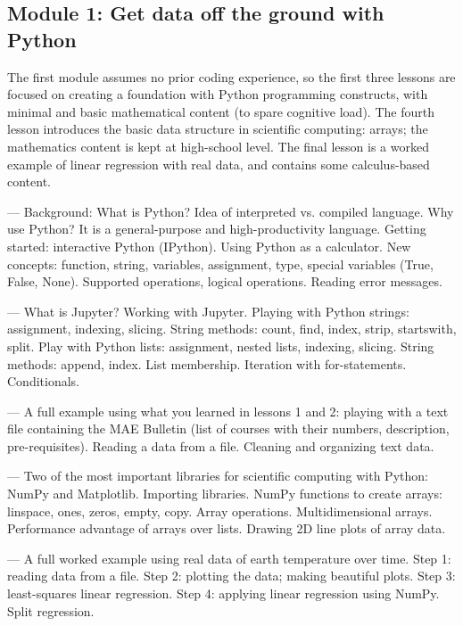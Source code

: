 \documentclass[10pt,journal,compsoc]{IEEEtran}
\begin{document}
\subsection*{Module 1: Get data off the ground with Python}
The first module assumes no prior coding experience, so the first three lessons are focused on creating a foundation with Python programming constructs, with minimal and basic mathematical content (to spare cognitive load). 
The fourth lesson introduces the basic data structure in scientific computing: arrays; the mathematics content is kept at high-school level.
The final lesson is a worked example of linear regression with real data, and contains some calculus-based content.

\begin{description}[style=unboxed]

\item[Lesson 1: Interacting with Python]---
Background: What is Python? Idea of interpreted vs. compiled language. Why use Python? It is a general-purpose and high-productivity language. Getting started: interactive Python (IPython). Using Python as a calculator. New concepts: function, string, variables, assignment, type, special variables (True, False, None). Supported operations, logical operations. Reading error messages.

\item[Lesson 2: Play with data in Jupyter]---
What is Jupyter? Working with Jupyter. Playing with Python strings: assignment, indexing, slicing. String methods: count, find, index, strip, startswith, split. Play with Python lists: assignment, nested lists, indexing, slicing. String methods: append, index. List membership. Iteration with for-statements. Conditionals.

\item[Lesson 3: Strings and lists in action]---
A full example using what you learned in lessons 1 and 2: playing with a text file containing the MAE Bulletin (list of courses with their numbers, description, pre-requisites). Reading a data from a file. Cleaning and organizing text data.

\item[Lesson 4: Play with NumPy arrays]---
Two of the most important libraries for scientific computing with Python: NumPy and Matplotlib. Importing libraries. NumPy functions to create arrays: linspace, ones, zeros, empty, copy. Array operations. Multidimensional arrays. Performance advantage of arrays over lists. Drawing 2D line plots of array data.

\item[Lesson 5: Linear regression with real data]---
A full worked example using real data of earth temperature over time. Step 1: reading data from a file. Step 2: plotting the data; making beautiful plots. Step 3: least-squares linear regression. Step 4: applying linear regression using NumPy. Split regression.

\end{description}
\end{document}
